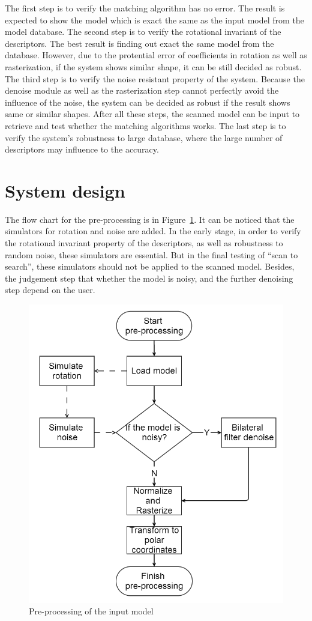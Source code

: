 The first step is to verify the matching algorithm has no error. The result is expected to show the model which is exact the same as the input model from the model database. The second step is to verify the rotational invariant of the descriptors. The best result is finding out exact the same model from the database. However, due to the protential error of coefficients in rotation as well as rasterization, if the system shows similar shape, it can be still decided as robust. The third step is to verify the noise resistant property of the system. Because the denoise module as well as the rasterization step cannot perfectly avoid the influence of the noise, the system can be decided as robust if the result shows same or similar shapes. After all these steps, the scanned model can be input to retrieve and test whether the matching algorithms works. The last step is to verify the system's robustness to large database, where the large number of descriptors may influence to the accuracy. 

\section{System design}

The flow chart for the pre-processing is in Figure~\ref{scan2search_preprocessing}. It can be noticed that the simulators for rotation and noise are added. In the early stage, in order to verify the rotational invariant property of the descriptors, as well as robustness to random noise, these simulators are essential. But in the final testing of ``scan to search'', these simulators should not be applied to the scanned model. Besides, the judgement step that whether the model is noisy, and the further denoising step depend on the user. 

\begin{figure}[h]
\centering
\includegraphics[width=0.5\linewidth]{scan2search_preprocessing}
\caption{Pre-processing of the input model} \label{scan2search_preprocessing}
\end{figure}

